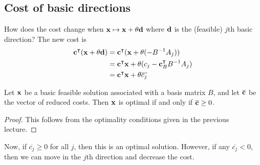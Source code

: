 \subsection{Cost of basic directions}
How does the cost change when \( \vb x \mapsto \vb x + \theta \vb d \) where \( \vb d \) is the (feasible) \( j \)th basic direction?
The new cost is
\begin{align*}
	\vb c^\intercal (\vb x + \theta \vb d) & = \vb c^\intercal (\vb x + \theta (-B^{-1}A_j))                        \\
	                                        & = \vb c^\intercal \vb x + \theta (c_j - \vb c_B^\intercal B^{-1} A_j) \\
	                                        & = \vb c^\intercal \vb x + \theta \overline{c_j}                        \\
\end{align*}
\begin{theorem}
	Let \( \vb x \) be a basic feasible solution associated with a basis matrix \( B \), and let \( \overline{\vb c} \) be the vector of reduced costs.
	Then \( \vb x \) is optimal if and only if \( \overline{\vb c} \geq 0 \).
\end{theorem}
\begin{proof}
	This follows from the optimality conditions given in the previous lecture.
\end{proof}
Now, if \( \overline{c_j} \geq 0 \) for all \( j \), then this is an optimal solution.
However, if any \( \overline{c_j} < 0 \), then we can move in the \( j \)th direction and decrease the cost.

